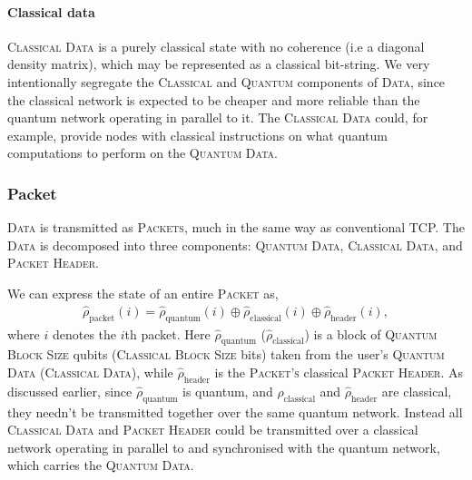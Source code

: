 %
%

\paragraph{Classical data} 

\textsc{Classical Data} is a purely classical state with no coherence (i.e a diagonal density matrix), which may be represented as a classical bit-string. We very intentionally segregate the \textsc{Classical} and \textsc{Quantum} components of \textsc{Data}, since the classical network is expected to be cheaper and more reliable than the quantum network operating in parallel to it. The \textsc{Classical Data} could, for example, provide nodes with classical instructions on what quantum computations to perform on the \textsc{Quantum Data}.

%
%

\subsubsection{Packet} \label{sec:packet_layer} 

\textsc{Data} is transmitted as \textsc{Packets}, much in the same way as conventional TCP. The \textsc{Data} is decomposed into three components: \textsc{Quantum Data}, \textsc{Classical Data}, and \textsc{Packet Header}.

We can express the state of an entire \textsc{Packet} as,
\begin{align}
\hat\rho_\mathrm{packet}(i) = \hat\rho_\mathrm{quantum}(i) \oplus \hat\rho_\mathrm{classical}(i) \oplus \hat\rho_\mathrm{header}(i),
\end{align}
where $i$ denotes the $i$th packet. Here $\hat\rho_\mathrm{quantum}$ ($\hat\rho_\mathrm{classical}$) is a block of \textsc{Quantum Block Size} qubits (\textsc{Classical Block Size} bits) taken from the user's \textsc{Quantum Data} (\textsc{Classical Data}), while $\hat\rho_\mathrm{header}$ is the \textsc{Packet's} classical \textsc{Packet Header}. As discussed earlier, since $\hat\rho_\mathrm{quantum}$ is quantum, and $\hat\rho_\mathrm{classical}$ and $\hat\rho_\mathrm{header}$ are classical, they needn't be transmitted together over the same quantum network. Instead all \textsc{Classical Data} and \textsc{Packet Header} could be transmitted over a classical network operating in parallel to and synchronised with the quantum network, which carries the \textsc{Quantum Data}.

